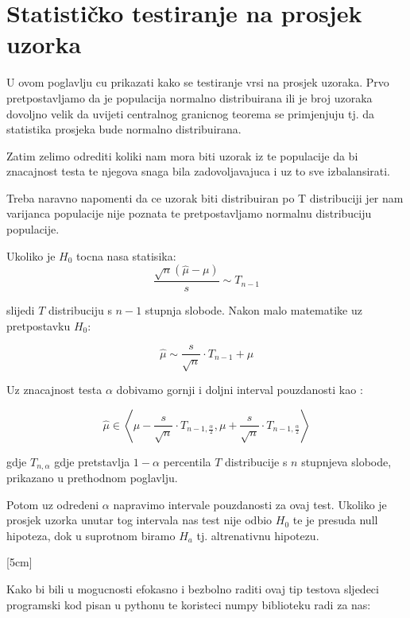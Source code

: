 \chapter{Statističko testiranje na prosjek uzorka}

U ovom poglavlju cu prikazati kako se testiranje vrsi na prosjek uzoraka. Prvo pretpostavljamo da je populacija normalno distribuirana ili je broj uzoraka dovoljno velik da uvijeti centralnog granicnog teorema se primjenjuju tj. da statistika prosjeka bude normalno distribuirana. 

Zatim zelimo odrediti koliki nam mora biti uzorak iz te populacije da bi znacajnost testa te njegova snaga bila zadovoljavajuca i uz to sve izbalansirati. 


Treba naravno napomenti da ce uzorak biti distribuiran po T distribuciji jer nam varijanca populacije nije poznata te pretpostavljamo normalnu distribuciju populacije.

Ukoliko je $H_0$ tocna nasa statisika: \[\frac{\sqrt{n} (\hat{\mu} - \mu)}{s} \sim T_{n-1}\]

slijedi $T$ distribuciju s $n-1$ stupnja slobode. Nakon malo matematike uz pretpostavku $H_0$:

\[
\hat{\mu} \sim \frac{s}{\sqrt{n}} \cdot T_{n-1} + \mu
\]

Uz znacajnost testa $\alpha$ dobivamo gornji i doljni interval pouzdanosti kao \cite{matstat}:

\[
\hat{\mu} \in \left<\mu - \frac{s}{\sqrt{n}} \cdot T_{n-1, \frac{\alpha}{2}}, \mu + \frac{s}{\sqrt{n}} \cdot T_{n-1, \frac{\alpha}{2}} \right>
\]

gdje $T_{n, \alpha}$ gdje pretstavlja $1-\alpha$ percentila $T$ distribucije s $n$ stupnjeva slobode, prikazano u prethodnom poglavlju.

Potom uz odredeni $\alpha$ napravimo intervale pouzdanosti za ovaj test. Ukoliko je prosjek uzorka unutar tog intervala nas test nije odbio $H_0$ te je presuda null hipoteza, dok u suprotnom biramo $H_a$ tj. altrenativnu hipotezu.


[5cm]

Kako bi bili u mogucnosti efokasno i bezbolno raditi ovaj tip testova sljedeci programski kod pisan u pythonu te koristeci numpy biblioteku radi za nas:

